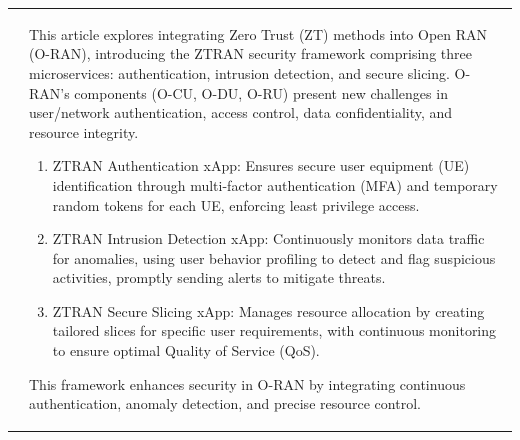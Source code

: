 \documentclass{report}
\begin{document}
\begin{longtable}{|p{4cm}|p{12cm}|}
    \cite{ztran} &
    \parbox[t]{12cm}{
        This article explores integrating Zero Trust (ZT) methods into Open RAN (O-RAN), introducing the ZTRAN security framework comprising three microservices: authentication, intrusion detection, and secure slicing. O-RAN’s components (O-CU, O-DU, O-RU) present new challenges in user/network authentication, access control, data confidentiality, and resource integrity. 
        \begin{enumerate}
            \item ZTRAN Authentication xApp: Ensures secure user equipment (UE) identification through multi-factor authentication (MFA) and temporary random tokens for each UE, enforcing least privilege access.
            \item ZTRAN Intrusion Detection xApp: Continuously monitors data traffic for anomalies, using user behavior profiling to detect and flag suspicious activities, promptly sending alerts to mitigate threats.
            \item ZTRAN Secure Slicing xApp: Manages resource allocation by creating tailored slices for specific user requirements, with continuous monitoring to ensure optimal Quality of Service (QoS).
        \end{enumerate}
        This framework enhances security in O-RAN by integrating continuous authentication, anomaly detection, and precise resource control.
    }\\ 
    \hline


\end{longtable}
\end{document}

